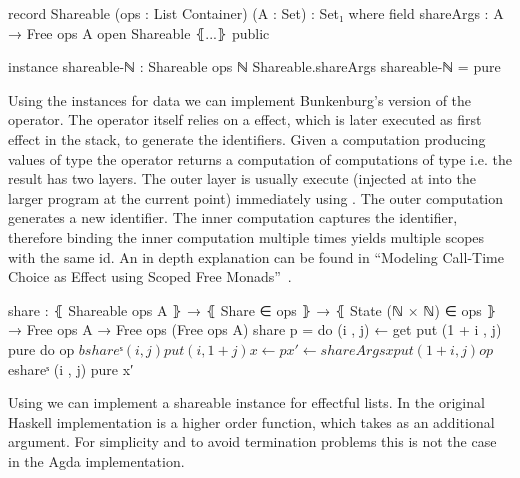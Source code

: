 \begin{code}
record Shareable (ops : List Container) (A : Set) : Set₁ where
  field
    shareArgs : A → Free ops A
open Shareable ⦃...⦄ public

instance
  shareable-ℕ : Shareable ops ℕ
  Shareable.shareArgs shareable-ℕ = pure
\end{code}
Using the instances for data we can implement Bunkenburg's version of the
operator.
The operator itself relies on a  effect, which is later
executed as first effect in the stack, to generate the identifiers.
Given a computation producing values of type  the operator
returns a computation of computations of type  i.e. the result
has two \AgdaSpace{} layers.
The outer layer is usually execute (injected at into the larger program at the
current point) immediately using \AgdaFunction{>>=}.
The outer computation generates a new identifier.
The inner computation captures the identifier, therefore binding the inner
computation multiple times yields multiple scopes with the same id.
An in depth explanation can be found in ``Modeling Call-Time Choice as Effect
using Scoped Free Monads''~\cite{bunkenburg2019modeling}.

\begin{code}
share : ⦃ Shareable ops A ⦄ → ⦃ Share ∈ ops ⦄ → ⦃ State (ℕ × ℕ) ∈ ops ⦄ →
  Free ops A → Free ops (Free ops A)
share p = do (i , j) ← get
             put (1 + i , j)
             pure do op $ bshareˢ (i , j)
                     put (i , 1 + j)
                     x   ← p
                     x′  ← shareArgs x
                     put (1 + i , j)
                     op $ eshareˢ (i , j)
                     pure x′
\end{code}
Using  we can implement a shareable instance for effectful
lists.
In the original Haskell implementation  is a higher
order function, which takes  as an additional argument.
For simplicity and to avoid termination problems this is not the case in the
Agda implementation.



